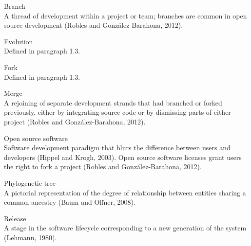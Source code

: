\begin{description}

\item{Branch} \hfill \\ A thread of development within a project or team; branches are common in open source development (Robles and González-Barahona, 2012).

\item{Evolution} \hfill \\ Defined in paragraph 1.3.

\item{Fork} \hfill \\ Defined in paragraph 1.3.

\item{Merge} \hfill \\ A rejoining of separate development strands that had branched or forked previously, either by integrating source code or by dismissing parts of either project (Robles and González-Barahona, 2012).

\item{Open source software} \hfill \\ Software development paradigm that blurs the difference between users and developers (Hippel and Krogh, 2003). Open source software licenses grant users the right to fork a project (Robles and González-Barahona, 2012).

\item{Phylogenetic tree} \hfill \\ A pictorial representation of the degree of relationship between entities sharing a common ancestry (Baum and Offner, 2008).

\item{Release} \hfill \\ A stage in the software lifecycle corresponding to a new generation of the system (Lehmann, 1980).

\end{description}


\mainmatter %

\pagestyle{thesis} %


